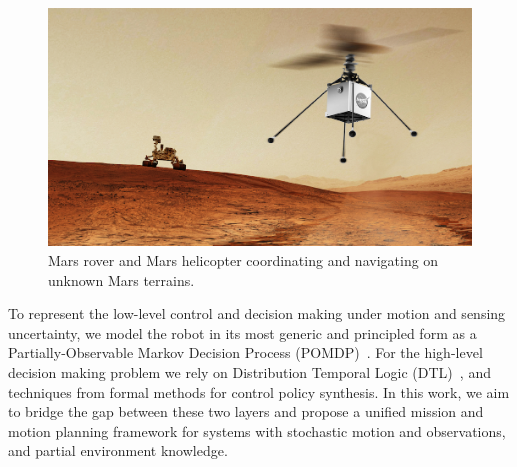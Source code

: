 \documentclass[conference]{IEEEtran}
\begin{document}
    
    \begin{figure}[t]
		\centering
		\includegraphics[width=0.75\columnwidth]{figs/heli-rover.png}
		\caption{Mars rover and Mars helicopter coordinating and navigating on unknown Mars terrains.}
		\label{fig:cover}
	\end{figure}
    
    To represent the low-level control and decision making under motion and sensing uncertainty, we model the robot
    in its most generic and principled form as a Partially-Observable Markov Decision Process
    (POMDP)~\cite{Kaelbling98,Smallwood73}.
    For the high-level decision making problem we rely on Distribution Temporal Logic (DTL)~\cite{JonesDTL2013},
    and techniques from formal methods for control policy synthesis.
    In this work, we aim to bridge the gap between these two layers and propose a unified mission and motion planning framework for systems with stochastic motion and observations, and partial environment knowledge.
	
\end{document}
